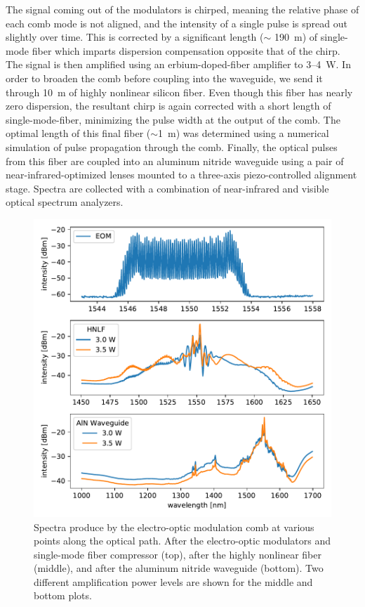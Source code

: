 The signal coming out of the modulators is chirped, meaning the relative phase of each comb mode is not aligned, and the intensity of a single pulse is spread out slightly over time. This is corrected by a significant length ($\sim$ 190~\si{\meter}) of single-mode fiber which imparts dispersion compensation opposite that of the chirp. The signal is then amplified using an erbium-doped-fiber amplifier to 3--4~\si{\watt}. In order to broaden the comb before coupling into the waveguide, we send it through 10~\si{\meter} of highly nonlinear silicon fiber. Even though this fiber has nearly zero dispersion, the resultant chirp is again corrected with a short length of single-mode-fiber, minimizing the pulse width at the output of the comb. The optimal length of this final fiber ($\sim$1~\si{\meter}) was determined using a numerical simulation of pulse propagation through the comb. Finally, the optical pulses from this fiber are coupled into an aluminum nitride waveguide using a pair of near-infrared-optimized lenses mounted to a three-axis piezo-controlled alignment stage. Spectra are collected with a combination of near-infrared and visible optical spectrum analyzers.

\begin{figure}
    \centering
    \includegraphics[width=\textwidth]{figures-3/eom-spectra.pdf}
    \caption[Electro-optic modulation comb spectra]{Spectra produce by the electro-optic modulation comb at various points along the optical path. After the electro-optic modulators and single-mode fiber compressor (top), after the highly nonlinear fiber (middle), and after the aluminum nitride waveguide (bottom). Two different amplification power levels are shown for the middle and bottom plots.}
    \label{fig:eom-spectra}
\end{figure}

